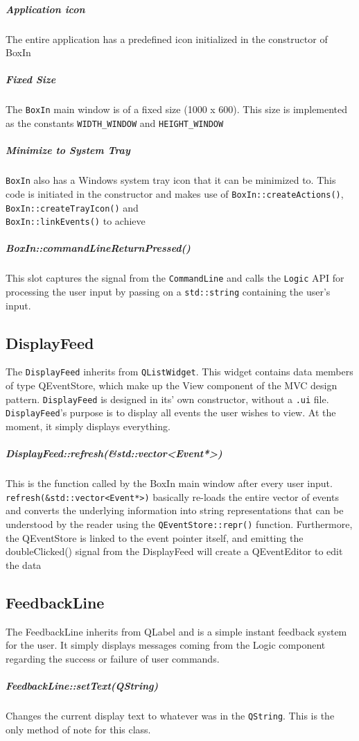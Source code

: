 \documentclass[12pt]{extarticle}
\begin{document}
\subparagraph{Application icon}
The entire application has a predefined icon initialized in the constructor of BoxIn
\pagebreak
\subparagraph{Fixed Size}
The \texttt{BoxIn} main window is of a fixed size (1000 x 600). This size is implemented as the constants \texttt{WIDTH\_WINDOW} and \texttt{HEIGHT\_WINDOW}
\subparagraph{Minimize to System Tray}
\texttt{BoxIn} also has a Windows system tray icon that it can be minimized to. This code is initiated in the constructor and makes use of \texttt{BoxIn::createActions()}, \texttt{BoxIn::createTrayIcon()} and\\ \texttt{BoxIn::linkEvents()} to achieve
\subparagraph{BoxIn::commandLineReturnPressed()}This slot captures the signal from the \texttt{CommandLine} and calls the \texttt{Logic} API for processing the user input by passing on a \texttt{std::string} containing the user's input.
\subsection{DisplayFeed}
The \texttt{DisplayFeed} inherits from \texttt{QListWidget}. This widget contains data members of type QEventStore, which make up the View component of the MVC design pattern. \texttt{DisplayFeed} is designed in its' own constructor, without a \texttt{.ui} file. \texttt{DisplayFeed}'s purpose is to display all events the user wishes to view. At the moment, it simply displays everything.
\subparagraph{DisplayFeed::refresh(\&std::vector<Event*>)} This is the function called by the BoxIn main window after every user input. \texttt{refresh(\&std::vector<Event*>)} basically re-loads the entire vector of events and converts the underlying information into string representations that can be understood by the reader using the \texttt{QEventStore::repr()} function. Furthermore, the QEventStore is linked to the event pointer itself, and emitting the doubleClicked() signal from the DisplayFeed will create a QEventEditor to edit the data

\subsection{FeedbackLine}
The FeedbackLine inherits from QLabel and is a simple instant feedback system for the user. It simply displays messages coming from the Logic component regarding the success or failure of user commands.
\subparagraph{FeedbackLine::setText(QString)} Changes the current display text to whatever was in the \texttt{QString}. This is the only method of note for this class.
\end{document}
